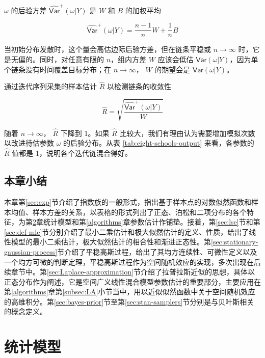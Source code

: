 \documentclass[12pt,a4paper,UTF8,twoside]{book}
\theoremstyle{definition}
\theoremstyle{definition}
\theoremstyle{definition}
\theoremstyle{remark}
\begin{document}
\noindent \(\omega\) 的后验方差 \(\widehat{\mathsf{Var}}^{+}(\omega|Y)\)
是 \(W\) 和 \(B\) 的加权平均

\begin{equation}
\widehat{\mathsf{Var}}^{+}(\omega|Y) = \frac{n-1}{n} W + \frac{1}{n} B 
\end{equation}

当初始分布发散时，这个量会高估边际后验方差，但在链条平稳或
\(n \to \infty\) 时，它是无偏的。同时，对任意有限的 \(n\)，组内方差
\(W\) 应该会低估
\(\mathsf{Var}(\omega|Y)\)，因为单个链条没有时间覆盖目标分布；在
\(n \to \infty\)， \(W\) 的期望会是 \(\mathsf{Var}(\omega|Y)\)。

通过迭代序列采集的样本估计 \(\hat{R}\) 以检测链条的收敛性

\begin{equation}
\hat{R} = \sqrt{\frac{\widehat{\mathsf{Var}}^{+}(\omega|Y)}{W}}
\end{equation}

\noindent 随着 \(n \to \infty\)， \(\hat{R}\) 下降到 1。如果 \(\hat{R}\)
比较大，我们有理由认为需要增加模拟次数以改进待估参数 \(\omega\)
的后验分布。从表 \ref{tab:eight-schools-output} 来看，各参数的
\(\hat{R}\) 值都是 1，说明各个迭代链混合得好。

\hypertarget{sec:foundations}{%
\section{本章小结}\label{sec:foundations}}

本章第\ref{sec:exp}节介绍了指数族的一般形式，指出基于样本点的对数似然函数和样本均值、样本方差的关系，以表格的形式列出了正态、泊松和二项分布的各个特征，为第\ref{models}章统计模型和第\ref{algorithms}章参数估计作铺垫。接着，第\ref{sec:lse}节和第\ref{sec:def-mle}节分别介绍了最小二乘估计和极大似然估计的定义、性质，给出了线性模型的最小二乘估计，极大似然估计的相合性和渐进正态性。第\ref{sec:stationary-gaussian-process}节介绍了平稳高斯过程，给出了其均方连续性、可微性定义以及一个均方可微的判断定理，平稳高斯过程作为空间随机效应的实现，多次出现在后续章节中。第\ref{sec:Laplace-approximation}节介绍了拉普拉斯近似的思想，具体以正态分布作为阐述，它是空间广义线性混合模型参数估计的重要部分，主要应用在第\ref{algorithms}章第\ref{subsec:LA}小节当中，用以近似似然函数中关于空间随机效应的高维积分。第\ref{sec:bayes-prior}节至第\ref{sec:stan-samplers}节分别是与贝叶斯相关的概念定义。

\hypertarget{models}{%
\chapter{统计模型}\label{models}}
\end{document}
